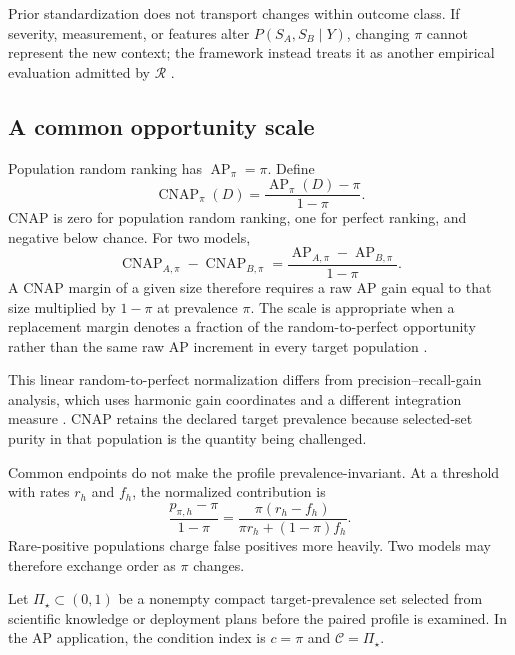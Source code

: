 \documentclass[11pt]{article}
\newcommand{\AP}{\operatorname{AP}}
\newcommand{\CNAP}{\operatorname{CNAP}}
\newcommand{\Regime}{\mathcal{R}}
\newcommand{\CSet}{\mathcal{C}}
\newcommand{\PSet}{\Pi_\star}
\theoremstyle{remark}
\begin{document}
Prior standardization does not transport changes within outcome class. If
severity, measurement, or features alter $P(S_A,S_B\mid Y)$, changing $\pi$
cannot represent the new context; the framework instead treats it as another
empirical evaluation admitted by $\Regime$
\cite{bareinboim2013transportability}.

\subsection{A common opportunity scale}

Population random ranking has $\AP_\pi=\pi$. Define
\begin{equation}
\CNAP_\pi(D)
=
\frac{\AP_\pi(D)-\pi}{1-\pi}.
\label{eq:cnap}
\end{equation}
CNAP is zero for population random ranking, one for perfect ranking, and
negative below chance. For two models,
\begin{equation}
\CNAP_{A,\pi}-\CNAP_{B,\pi}
=
\frac{\AP_{A,\pi}-\AP_{B,\pi}}{1-\pi}.
\label{eq:cnap-difference}
\end{equation}
A CNAP margin of a given size therefore requires a raw AP gain equal to that
size multiplied by $1-\pi$ at prevalence $\pi$. The scale is appropriate when
a replacement margin denotes a fraction
of the random-to-perfect opportunity rather than the same raw AP increment in
every target population \cite{cohen1960coefficient}.

This linear random-to-perfect normalization differs from
precision--recall-gain analysis, which uses harmonic gain coordinates and a
different integration measure \cite{flach2015prg}. CNAP retains the declared
target prevalence because selected-set purity in that population is the
quantity being challenged.

Common endpoints do not make the profile prevalence-invariant. At a threshold
with rates $r_h$ and $f_h$, the normalized contribution is
\begin{equation}
\frac{p_{\pi,h}-\pi}{1-\pi}
=
\frac{\pi(r_h-f_h)}
{\pi r_h+(1-\pi)f_h}.
\label{eq:threshold-cnap}
\end{equation}
Rare-positive populations charge false positives more heavily. Two models may
therefore exchange order as $\pi$ changes.

Let $\PSet\subset(0,1)$ be a nonempty compact target-prevalence set selected
from scientific knowledge or deployment plans before the paired profile is
examined. In the AP application, the condition index is $c=\pi$ and
$\CSet=\PSet$.
\end{document}
